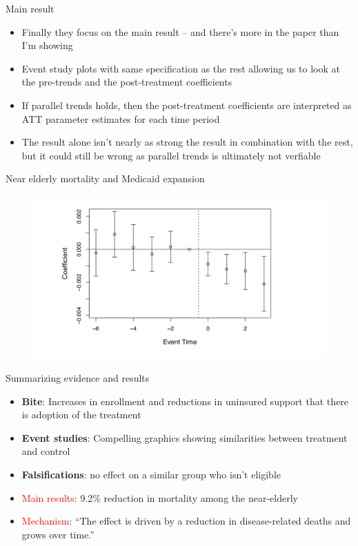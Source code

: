 \documentclass{beamer}
\begin{document}
\begin{frame}{Main result}

\begin{itemize}

\item Finally they focus on the main result -- and there's more in the paper than I'm showing
\item Event study plots with same specification as the rest allowing us to look at the pre-trends and the post-treatment coefficients
\item If parallel trends holds, then the post-treatment coefficients are interpreted as ATT parameter estimates for each time period
\item The result alone isn't nearly as strong the result in combination with the rest, but it could still be wrong as parallel trends is ultimately not verfiable
\end{itemize}

\end{frame}



\begin{frame}{Near elderly mortality and Medicaid expansion}

	\begin{figure}
	\includegraphics[scale=0.3]{./lecture_includes/Miller_Medicaid4.png}
	\end{figure}

\end{frame}

\begin{frame}{Summarizing evidence and results}

\begin{itemize}
\item \textbf{Bite}: Increases in enrollment and reductions in uninsured support that there is adoption of the treatment
\item \textbf{Event studies}: Compelling graphics showing similarities between treatment and control
\item \textbf{Falsifications}: no effect on a similar group who isn't eligible
\item \textcolor{red}{Main results}: 9.2\% reduction in mortality among the near-elderly
\item \textcolor{red}{Mechanism}: ``The effect is driven by a reduction in disease-related deaths and grows over time.''
\end{itemize}

\end{frame}
\end{document}
